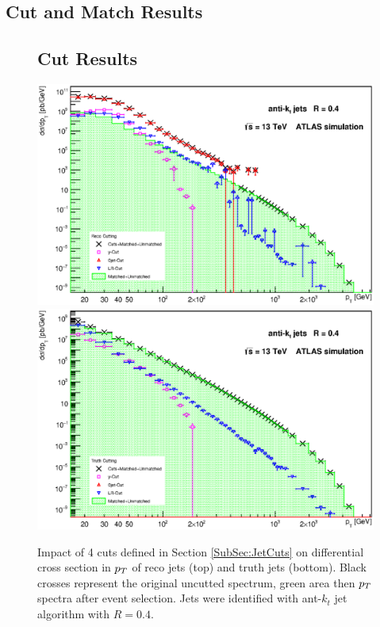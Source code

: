 \begin{appendices}

\chapter{Cut and Match Results}
\label{App:CutAndMatchingResults}

\newpage 

\begin{figure}[p]
\section{Cut Results}
\label{sec:CutResults}
  \centering
  \includegraphics[width=\textwidth]{Chapter3/SignalCutting.eps}
  \includegraphics[width=\textwidth]{Chapter3/TruthCutting.eps}
  \caption{Impact of 4 cuts defined in Section \ref{SubSec:JetCuts} on
  differential cross section in $p_{T}$ of reco jets (top) and truth jets
  (bottom). Black crosses represent the original uncutted spectrum, green area then
  $p_{T}$ spectra after event selection. Jets were identified with ant-$k_t$ jet
  algorithm with $R=0.4$.}
  \label{fig:Cutting}
\end{figure}


\end{appendices}
